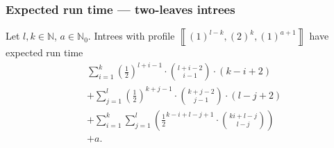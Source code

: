 \documentclass{beamer}
\newcommand{\profile}[1]{\left\llbracket #1 \right\rrbracket}
\newcommand{\profileconcat}{\circ}
\newcommand{\profilerepeat}[2]{{(#1)}^{#2}}
\newcommand{\profileones}[1]{\profilerepeat{1}{#1}}
\newcommand{\E}[1]{\mathbb{E}\left[ #1 \right]}
\newcommand{\naturals}{\mathbb{N}}
\begin{document}

\begin{frame}
  \frametitle{Expected run time --- two-leaves intrees}
  \begin{theorem}[Maaß 2001]
    Let $l, k\in\naturals$, $a\in\naturals_0$. Intrees with profile $\profile{\profilerepeat{1}{l-k}, \profilerepeat{2}{k}, \profilerepeat{1}{a+1}}$ have expected run time
    \begin{align*}
      & \sum_{i=1}^k \left(\frac{1}{2}\right)^{l+i-1} \cdot \binom{l+i-2}{i-1} \cdot \left( k-i+2 \right) \\
       & + \sum_{j=1}^l \left(\frac{1}{2}\right)^{k+j-1} \cdot \binom{k+j-2}{j-1} \cdot \left( l-j+2 \right) \\
       & + \sum_{i=1}^k \sum_{j=1}^l \left( \frac{1}{2}^{k-i+l-j+1}\cdot\binom{ki+l-j}{l-j} \right) \\
       & + a
      .
    \end{align*}
  \end{theorem}
\end{frame}
\end{document}
